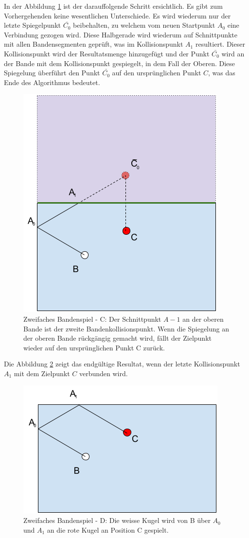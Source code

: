 \newpage
In der Abbildung \ref{fig:zweifaches_bandenspiel_c} ist der darauffolgende Schritt ersichtlich.
Es gibt zum Vorhergehenden keine wesentlichen Unterschiede.
Es wird wiederum nur der letzte Spiegelpunkt $\bar{C_0}$ beibehalten, zu welchem vom
neuen Startpunkt $A_0$ eine Verbindung gezogen wird.
Diese Halbgerade wird wiederum auf Schnittpunkte mit allen Bandensegmenten geprüft, was im Kollisionspunkt $A_1$ resultiert.
Dieser Kollisionspunkt wird der Resultatsmenge hinzugefügt und der Punkt $\bar{C_0}$
wird an der Bande mit dem Kollisionspunkt gespiegelt, in dem Fall der Oberen.
Diese Spiegelung überführt den Punkt $\bar{C_0}$ auf den ursprünglichen Punkt $C$, was das Ende des Algorithmus
bedeutet.
\begin{figure}[h]
    \begin{center}
        \includegraphics[width=0.5\linewidth]{../common/03_billiard_ai/resources/52_rail_reflection_2_c.png}
    \end{center}
    \caption{Zweifaches Bandenspiel - C: Der Schnittpunkt $A-1$ an der oberen Bande ist der zweite Bandenkollisionspunkt.
    Wenn die Spiegelung an der oberen Bande rückgängig gemacht wird, fällt der Zielpunkt wieder auf den ursprünglichen Punkt C zurück.}
    \label{fig:zweifaches_bandenspiel_c}
\end{figure}

Die Abbildung \ref{fig:zweifaches_bandenspiel_d} zeigt das endgültige Resultat, wenn der letzte Kollisionspunkt $A_1$
mit dem Zielpunkt $C$ verbunden wird.

\begin{figure}[h!]
    \begin{center}
        \includegraphics[width=0.5\linewidth]{../common/03_billiard_ai/resources/53_rail_reflection_2_d.png}
    \end{center}
    \caption{Zweifaches Bandenspiel - D: Die weisse Kugel wird von B über $A_0$ und $A_1$ an die rote Kugel an Position C gespielt.}
    \label{fig:zweifaches_bandenspiel_d}
\end{figure}

